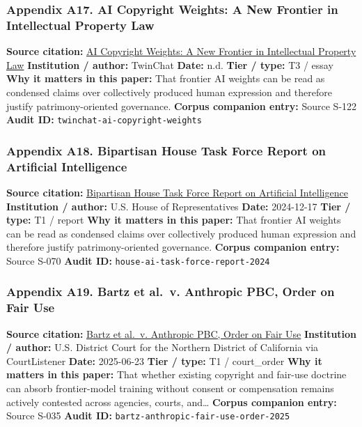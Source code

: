 \documentclass[
  american,
  11pt,
  letterpaper,
]{article}
\begin{document}
\subsubsection{Appendix A17. AI Copyright Weights: A New Frontier in
Intellectual Property
Law}\label{ch-10-appendix-a17-ai-copyright-weights-a-new-frontier-in-intellectual-property-law}

\textbf{Source citation:}
\href{https://medium.com/twinchat/ai-copyright-weights-a-new-frontier-in-intellectual-property-law-d8ee1b6c55ee}{AI
Copyright Weights: A New Frontier in Intellectual Property Law}
\textbf{Institution / author:} TwinChat \textbf{Date:} n.d. \textbf{Tier
/ type:} T3 / essay \textbf{Why it matters in this paper:} That frontier
AI weights can be read as condensed claims over collectively produced
human expression and therefore justify patrimony-oriented governance.
\textbf{Corpus companion entry:} Source S-122 \textbf{Audit ID:}
\texttt{twinchat-ai-copyright-weights}

\subsubsection{Appendix A18. Bipartisan House Task Force Report on
Artificial
Intelligence}\label{ch-10-appendix-a18-bipartisan-house-task-force-report-on-artificial-intelligence}

\textbf{Source citation:}
\href{https://www.speaker.gov/wp-content/uploads/2024/12/AI-Task-Force-Report-FINAL.pdf}{Bipartisan
House Task Force Report on Artificial Intelligence} \textbf{Institution
/ author:} U.S. House of Representatives \textbf{Date:} 2024-12-17
\textbf{Tier / type:} T1 / report \textbf{Why it matters in this paper:}
That frontier AI weights can be read as condensed claims over
collectively produced human expression and therefore justify
patrimony-oriented governance. \textbf{Corpus companion entry:} Source
S-070 \textbf{Audit ID:} \texttt{house-ai-task-force-report-2024}

\subsubsection{Appendix A19. Bartz et al.~v. Anthropic PBC, Order on
Fair
Use}\label{ch-10-appendix-a19-bartz-et-al-v-anthropic-pbc-order-on-fair-use}

\textbf{Source citation:}
\href{https://storage.courtlistener.com/recap/gov.uscourts.cand.434709/gov.uscourts.cand.434709.231.0_3.pdf}{Bartz
et al.~v. Anthropic PBC, Order on Fair Use} \textbf{Institution /
author:} U.S. District Court for the Northern District of California via
CourtListener \textbf{Date:} 2025-06-23 \textbf{Tier / type:} T1 /
court\_order \textbf{Why it matters in this paper:} That whether
existing copyright and fair-use doctrine can absorb frontier-model
training without consent or compensation remains actively contested
across agencies, courts, and\ldots{} \textbf{Corpus companion entry:}
Source S-035 \textbf{Audit ID:}
\texttt{bartz-anthropic-fair-use-order-2025}
\end{document}
